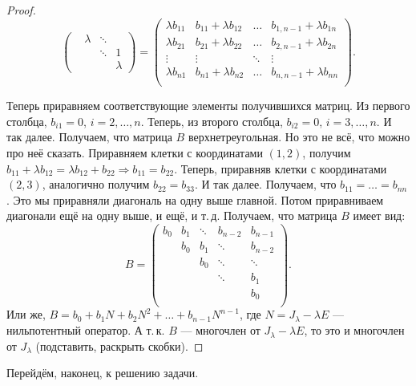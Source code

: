 \begin{proof}
\[\begin{pmatrix}
         & \lambda & \ddots & \\
         & & \ddots & 1 \\
         & & & \lambda
    \end{pmatrix} =
    \begin{pmatrix}
        \lambda b_{11} & b_{11} + \lambda b_{12} & \ldots & b_{1, n - 1} + \lambda b_{1n}\\
        \lambda b_{21} & b_{21} + \lambda b_{22} & \ldots & b_{2, n - 1} + \lambda b_{2n}\\
        \vdots & \vdots & \ddots & \vdots\\
        \lambda b_{n1} & b_{n1} + \lambda b_{n2} & \ldots & b_{n, n - 1} + \lambda b_{nn}\\
    \end{pmatrix}.
    \]

    Теперь приравняем соответствующие элементы получившихся матриц. Из первого столбца, $b_{i1} = 0$, $i = 2, \ldots, n$. Теперь, из второго столбца, $b_{i2} = 0$, $i = 3, \ldots, n$. И так далее. Получаем, что матрица $B$ верхнетреугольная. Но это не всё, что можно про неё сказать. Приравняем клетки с координатами $(1, 2)$, получим $b_{11} + \lambda b_{12} = \lambda b_{12} + b_{22} \Rightarrow b_{11} = b_{22}$. Теперь, приравняв клетки с координатами $(2, 3)$, аналогично получим $b_{22} = b_{33}$. И так далее. Получаем, что $b_{11} = \ldots = b_{nn}$. Это мы приравняли диагональ на одну выше главной. Потом приравниваем диагонали ещё на одну выше, и ещё, и т.\,д. Получаем, что матрица $B$ имеет вид:
    \[
        B =
        \begin{pmatrix}
            b_0 & b_1 & \ddots & b_{n - 2} & b_{n - 1}\\
                & b_0 & b_1 & \ddots & b_{n - 2}\\
                &     & b_0    & \ddots & \ddots\\
                &     &        & \ddots & b_1\\
                &     &        &        & b_0\\
        \end{pmatrix}.
    \]
    Или же, $B = b_0 + b_1N + b_2N^2 + \ldots + b_{n - 1}N^{n - 1}$, где $N = J_\lambda - \lambda E$ --- нильпотентный оператор. А т.\,к. $B$ --- многочлен от $J_\lambda - \lambda E$, то это и многочлен от $J_\lambda$ (подставить, раскрыть скобки).
\end{proof}

Перейдём, наконец, к решению задачи.

